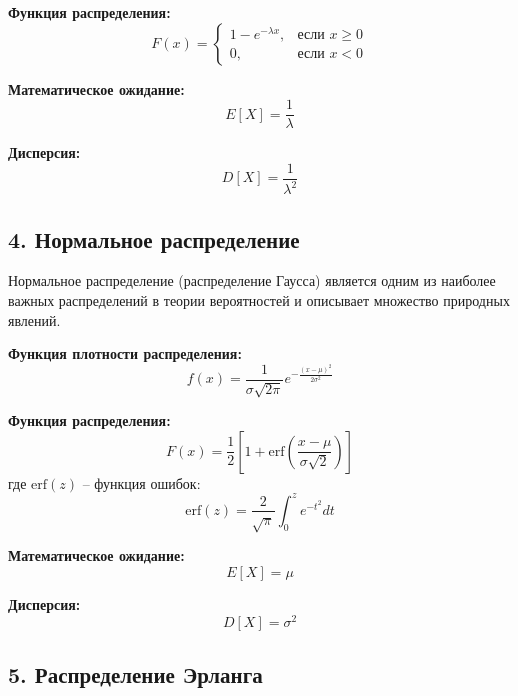 \textbf{Функция распределения:}
\begin{equation}
F(x) = 
\begin{cases}
1 - e^{-\lambda x}, & \text{если } x \geq 0 \\
0, & \text{если } x < 0
\end{cases}
\end{equation}

\textbf{Математическое ожидание:}
\begin{equation}
E[X] = \frac{1}{\lambda}
\end{equation}

\textbf{Дисперсия:}
\begin{equation}
D[X] = \frac{1}{\lambda^2}
\end{equation}

\subsection*{4. Нормальное распределение}

Нормальное распределение (распределение Гаусса) является одним из наиболее важных распределений в теории вероятностей и описывает множество природных явлений.

\textbf{Функция плотности распределения:}
\begin{equation}
f(x) = \frac{1}{\sigma\sqrt{2\pi}} e^{-\frac{(x - \mu)^2}{2\sigma^2}}
\end{equation}

\textbf{Функция распределения:}
\begin{equation}
F(x) = \frac{1}{2} \left[ 1 + \text{erf}\left( \frac{x - \mu}{\sigma\sqrt{2}} \right) \right]
\end{equation}
где $\text{erf}(z)$ -- функция ошибок:
\begin{equation}
\text{erf}(z) = \frac{2}{\sqrt{\pi}} \int_0^z e^{-t^2} dt
\end{equation}

\textbf{Математическое ожидание:}
\begin{equation}
E[X] = \mu
\end{equation}

\textbf{Дисперсия:}
\begin{equation}
D[X] = \sigma^2
\end{equation}

\subsection*{5. Распределение Эрланга}

